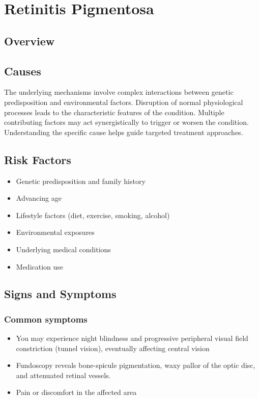 \chapter{Retinitis Pigmentosa}
\label{sec:Retinitis Pigmentosa}

\section{Overview}

\section{Causes}
The underlying mechanisms involve complex interactions between genetic predisposition and environmental factors. Disruption of normal physiological processes leads to the characteristic features of the condition. Multiple contributing factors may act synergistically to trigger or worsen the condition. Understanding the specific cause helps guide targeted treatment approaches.
\section{Risk Factors}


\begin{itemize}[noitemsep]
  \item Genetic predisposition and family history
  \item Advancing age
  \item Lifestyle factors (diet, exercise, smoking, alcohol)
  \item Environmental exposures
  \item Underlying medical conditions
  \item Medication use
\end{itemize}
\section{Signs and Symptoms}

\subsection{Common symptoms}
\begin{itemize}[noitemsep]
  \item You may experience night blindness and progressive peripheral visual field constriction (tunnel vision), eventually affecting central vision
  \item Fundoscopy reveals bone-spicule pigmentation, waxy pallor of the optic disc, and attenuated retinal vessels.
  \item Pain or discomfort in the affected area
  \end{itemize}

